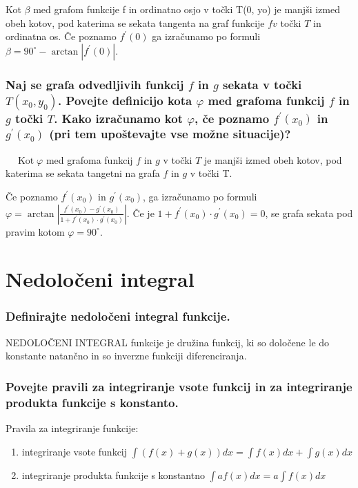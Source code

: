 \documentclass{article}
\begin{document}
Kot $\beta$ med grafom funkcije f in ordinatno osjo $\mathrm{v}$ točki T(0, yo) je manjši izmed obeh kotov, pod katerima se sekata tangenta na graf funkcije $f v$ točki $T$ in ordinatna os. Če poznamo $f^{\prime}(0)$ ga izračunamo po formuli $\beta=90^{\circ}-\arctan \left|f^{\prime}(0)\right|$.



\subsubsection*{Naj se grafa odvedljivih funkcij $f$ in $g$ sekata v točki $T\left(x_{0}, y_{0}\right)$. Povejte definicijo kota $\varphi$ med grafoma funkcij $f$ in $g$ točki $T$. Kako izračunamo kot $\varphi$, če poznamo $f^{\prime}\left(x_{0}\right)$ in $g^{\prime}\left(x_{0}\right)$ (pri tem upoštevajte vse možne situacije)?}

$\quad \operatorname{Kot} \varphi$ med grafoma funkcij $f$ in $g$ v točki $T$ je manjši izmed obeh kotov, pod katerima se sekata tangetni na grafa $f$ in $g$ v točki T.

Če poznamo $f^{\prime}\left(x_{0}\right)$ in $g^{\prime}\left(x_{0}\right)$, ga izračunamo po formuli $\varphi=\arctan \left|\frac{f^{\prime}\left(x_{0}\right)-g^{\prime}\left(x_{0}\right)}{1+f^{\prime}\left(x_{0}\right) \cdot g^{\prime}\left(x_{0}\right)}\right|$. Če je $1+f^{\prime}\left(x_{0}\right) \cdot g^{\prime}\left(x_{0}\right)=0$, se grafa sekata pod pravim kotom $\varphi=90^{\circ}$.

\section{Nedoločeni integral}
\subsubsection*{Definirajte nedoločeni integral funkcije.}

NEDOLOČENI INTEGRAL funkcije je družina funkcij, ki so določene le do konstante natančno in so inverzne funkciji diferenciranja.

\subsubsection*{Povejte pravili za integriranje vsote funkcij in za integriranje produkta funkcije s konstanto.}

Pravila za integriranje funkcije:

\begin{enumerate}
  \item integriranje vsote funkcij
  $\int(f(x)+g(x)) d x=\int f(x) d x+\int g(x) d x$
  \item integriranje produkta funkcije s konstantno
  $\int a f(x) d x=a \int f(x) d x$
\end{enumerate}
\end{document}
